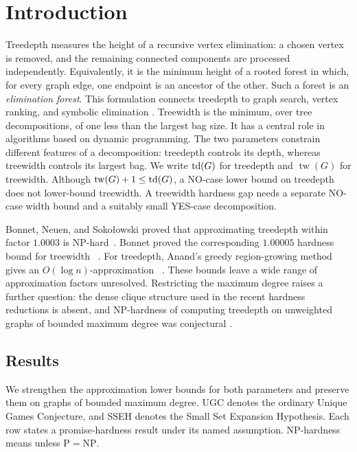 ﻿\section{Introduction}
\label{sec:introduction}

Treedepth measures the height of a recursive vertex elimination:
a chosen vertex is removed, and the remaining connected components
are processed independently. Equivalently, it is the minimum height
of a rooted forest in which, for every graph edge, one endpoint is
an ancestor of the other. Such a forest is an \emph{elimination forest}.
This formulation connects treedepth to graph search,
vertex ranking, and symbolic elimination
\cite{Reidl2014,BodlaenderRankings}. Treewidth is the minimum, over
tree decompositions, of one less than the largest bag size. It has a
central role in algorithms based on dynamic programming. The two
parameters constrain different features of a decomposition: treedepth
controls its depth, whereas treewidth controls its largest bag. We
write $\operatorname{td}(G)$ for treedepth
and $\operatorname{tw}(G)$ for treewidth. Although
$\operatorname{tw}(G)+1\leq\operatorname{td}(G)$, a NO-case lower bound on treedepth
does not lower-bound treewidth. A treewidth hardness gap needs a
separate NO-case width bound and a suitably small YES-case decomposition.

Bonnet, Neuen, and Soko\l owski proved that approximating treedepth
within factor $1.0003$ is \textup{NP}-hard~\cite{BNS}. Bonnet proved the
corresponding $1.00005$ hardness bound for treewidth
~\cite{BonnetTreewidth}. For treedepth, Anand's greedy
region-growing method gives an $O(\log n)$-approximation
~\cite{Anand2026}. These bounds leave a wide range of approximation
factors unresolved. Restricting the maximum degree raises a further
question: the dense clique structure used in the recent hardness
reductions is absent, and \textup{NP}-hardness of computing treedepth on
unweighted graphs of bounded maximum degree was conjectural
\cite[Conjecture~1]{SchirrmacherSiebertzVigny2025}.

\subsection{Results}

We strengthen the approximation lower bounds for both parameters
and preserve them on graphs of bounded maximum degree. \textup{UGC} denotes
the ordinary Unique Games Conjecture, and \textup{SSEH} denotes the Small Set
Expansion Hypothesis.
Each row states a promise-hardness result under its named assumption.
\textup{NP}-hardness means unless $\mathrm{P}=\mathrm{NP}$.

